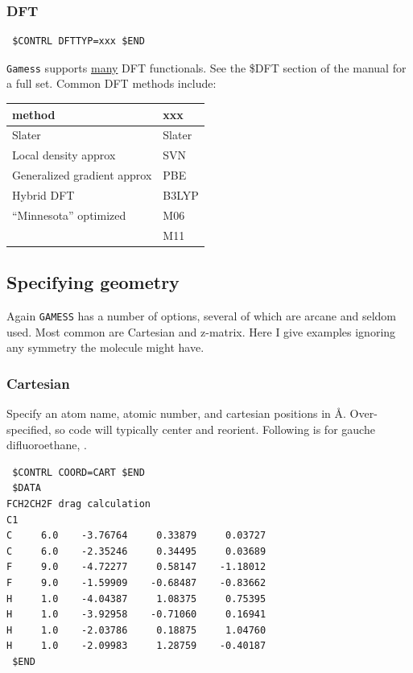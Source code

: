 \documentclass[11pt]{article}
\begin{document}
\subsubsection{DFT}
\label{sec:org545ade3}
\begin{verbatim}
 $CONTRL DFTTYP=xxx $END
\end{verbatim}
\texttt{Gamess} supports \uline{many} DFT functionals.  See the \$DFT section of the manual for a full set.  Common DFT methods include:
\begin{center}
\begin{tabular}{ll}
\hline
method & xxx\\
\hline
Slater & Slater\\
Local density approx & SVN\\
Generalized gradient approx & PBE\\
Hybrid DFT & B3LYP\\
``Minnesota'' optimized & M06\\
 & M11\\
\hline
\end{tabular}
\end{center}

\subsection{Specifying geometry}
\label{sec:orgdbf3244}
Again \texttt{GAMESS} has a number of options, several of which are arcane and seldom used.  Most common are Cartesian and z-matrix.  Here I give examples ignoring any symmetry the molecule might have.
\subsubsection{Cartesian}
\label{sec:org21d6cf9}
Specify an atom name, atomic number, and cartesian positions in \AA{}.  Over-specified, so code will typically center and reorient.  Following is for gauche difluoroethane, .
\begin{verbatim}
 $CONTRL COORD=CART $END
 $DATA
FCH2CH2F drag calculation
C1
C     6.0    -3.76764     0.33879     0.03727
C     6.0    -2.35246     0.34495     0.03689
F     9.0    -4.72277     0.58147    -1.18012
F     9.0    -1.59909    -0.68487    -0.83662
H     1.0    -4.04387     1.08375     0.75395
H     1.0    -3.92958    -0.71060     0.16941
H     1.0    -2.03786     0.18875     1.04760
H     1.0    -2.09983     1.28759    -0.40187
 $END
\end{verbatim}
\end{document}
